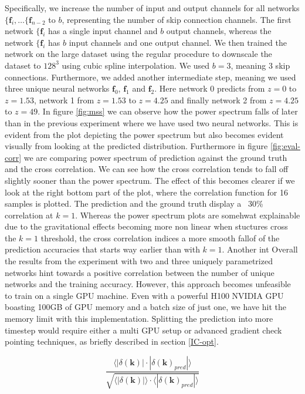 \documentclass{article}
\begin{document}
Specifically, we increase the number of input and output channels for all networks $\{\mathbf{f}_i, \dots \{\mathbf{f}_{n-2}$ to $b$, representing the number of skip connection channels. The first network $\{\mathbf{f}_i$ has a single input channel and $b$ output channels, whereas the network $\{\mathbf{f}_i$ has $b$ input channels and one output channel. We then trained the network on the large dataset using the regular procedure to downscale the dataset to $128^3$ using cubic spline interpolation. We used $b=3$, meaning 3 skip connections. Furthermore, we added another intermediate step, meaning we used three unique neural networks $\mathbf{f}_0$, $\mathbf{f}_1$ and $\mathbf{f}_2$. Here network 0 predicts from $z=0$ to $z=1.53$, network 1 from $z=1.53$ to $z=4.25$ and finally network 2 from $z=4.25$ to $z=49$. In figure \ref{fig:mss} we can observe how the power spectrum falls of later than in the previous experiment where we have used two neural networks. This is evident from the plot depicting the power spectrum but also becomes evident visually from looking at the predicted distribution. Furthermore in figure \ref{fig:eval-corr} we are comparing power spectrum of prediction against the ground truth and the cross correlation. We can see how the cross correlation tends to fall off slightly sooner than the power spectrum. The effect of this becomes clearer if we look at the right bottom part of the plot, where the correlation function for 16 samples is plotted. The prediction and the ground truth display a ~30\% correlation at $k=1$. Whereas the power spectrum plots are somehwat explainable due to the gravitational effects becoming more non linear when stuctures cross the $k=1$ threshold, the cross correlation indices a more smooth fallof of the prediction accuracies that starts way earlier than with $k=1$. Another int
Overall the results from the experiment with two and three uniquely parametrized networks hint towards a positive correlation between the number of unique networks and the training accuracy. However, this approach becomes unfeasible to train on a single GPU machine. Even with a powerful H100 NVIDIA GPU boasting 100GB of GPU memory and a batch size of just one, we have hit the memory limit with this implementation. Splitting the prediction into more timestep would require either a multi GPU setup or advanced gradient check pointing techniques, as briefly described in section \ref{IC-opt}. 


\begin{equation}
    \label{equation-corr}
    \frac{ \langle |\delta(\mathbf{k})| \cdot |\delta(\mathbf{k})_{pred}| \rangle }{ \sqrt{ \langle |\delta(\mathbf{k})| \rangle \cdot  \langle |\delta(\mathbf{k})_{pred}| \rangle }}
\end{equation}
\end{document}
